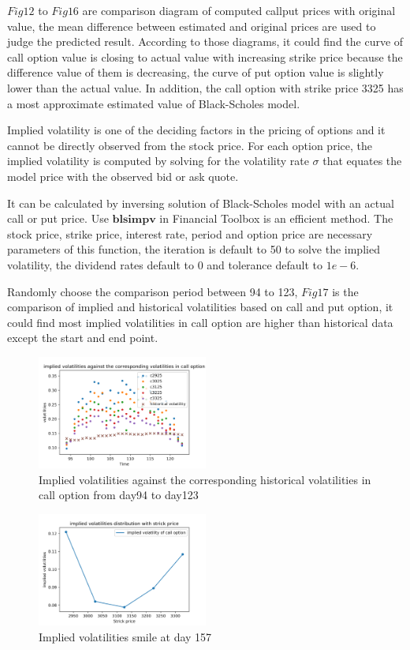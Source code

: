 \documentclass[sigconf]{acmart}
\begin{document}
$Fig12$ to $Fig16$ are comparison diagram of computed call\/put prices with original value, the mean difference between estimated and original prices are used to judge the predicted result. According to those diagrams, it could find the curve of call option value is closing to actual value with increasing strike price because the difference value of them is decreasing, the curve of put option value is slightly lower than the actual value. In addition, the call option with strike price 3325 has a most approximate estimated value of Black-Scholes model.



Implied volatility is one of the deciding factors in the pricing of options and it cannot be directly observed from the stock price. For each option price, the implied volatility is computed by solving for the volatility rate $\sigma$ that equates the model price with the observed bid or ask quote\cite{dumas1998implied}.

It can be calculated by inversing solution of Black-Scholes model with an actual call or put price. Use $\bm{blsimpv}$ in Financial Toolbox is an efficient method. The stock price, strike price, interest rate, period and option price are necessary parameters of this function, the iteration is default to 50 to solve the implied volatility, the dividend rates default to 0 and tolerance default to $1e-6$.

Randomly choose the comparison period between 94 to 123, $Fig17$ is the comparison of implied and historical volatilities based on call and put option, it could find most implied volatilities in call option are higher than historical data except the start and end point. 

\begin{figure}[htbp]
    \centering
    \includegraphics[width=0.50\textwidth]{19.png}
    \caption{\label{}Implied volatilities against the corresponding historical volatilities in call option from day94 to day123}
\end{figure}

\begin{figure}[htbp]
    \centering
    \includegraphics[width=0.50\textwidth]{20.png}
    \caption{\label{}Implied volatilities smile at day 157}
\end{figure}
\end{document}
